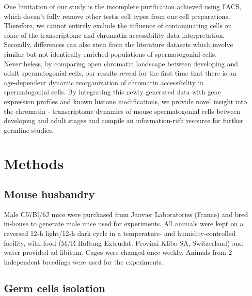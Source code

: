 \documentclass[12pt,twoside]{reedthesis}
\begin{document}
One limitation of our study is the incomplete purification achieved
using FACS, which doesn't fully remove other testis cell types from our
cell preparations. Therefore, we cannot entirely exclude the influence
of contaminating cells on some of the transcriptome and chromatin
accessibility data interpretation. Secondly, differences can also stem
from the literature datasets which involve similar but not identically
enriched populations of spermatogonial cells. Nevertheless, by comparing
open chromatin landscape between developing and adult spermatogonial
cells, our results reveal for the first time that there is an
age-dependent dynamic reorganization of chromatin accessibility in
spermatogonial cells. By integrating this newly generated data with gene
expression profiles and known histone modifications, we provide novel
insight into the chromatin - transcriptome dynamics of mouse
spermatogonial cells between developing and adult stages and compile an
information-rich resource for further germline studies.

\newpage

\hypertarget{methods-1}{%
\section{Methods}\label{methods-1}}

\hypertarget{mouse-husbandry}{%
\subsection{Mouse husbandry}\label{mouse-husbandry}}

Male C57Bl/6J mice were purchased from Janvier Laboratories (France) and
bred in-house to generate male mice used for experiments. All animals
were kept on a reversed 12-h light/12-h dark cycle in a temperature- and
humidity-controlled facility, with food (M/R Haltung Extrudat, Provimi
Kliba SA, Switzerland) and water provided ad libitum. Cages were changed
once weekly. Animals from 2 independent breedings were used for the
experiments.

\hypertarget{germ-cells-isolation}{%
\subsection{Germ cells isolation}\label{germ-cells-isolation}}
\end{document}
